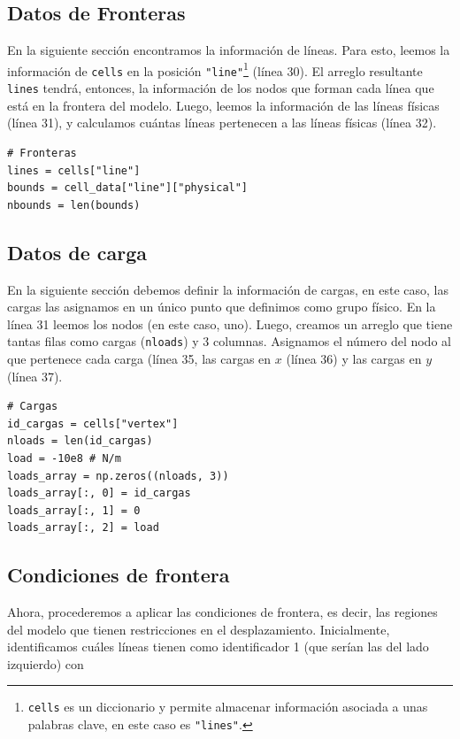 \documentclass[12pt,letterpaper]{article}
\newcommand{\mintpy}[1]{\texttt{#1}}
\begin{document}
\subsection{Datos de Fronteras}
En la siguiente sección encontramos la información de líneas. Para esto, leemos la información de \mintpy{cells} en la posición \mintpy{"line"}\footnote{\mintpy{cells} es un diccionario y permite almacenar información asociada a unas palabras clave, en este caso es \mintpy{"lines"}.} (línea 30). El arreglo resultante \mintpy{lines} tendrá, entonces, la información de los nodos que forman cada línea que está en la frontera del modelo. Luego, leemos la información de las líneas físicas (línea 31), y calculamos cuántas líneas pertenecen a las líneas físicas (línea 32).
\begin{verbatim}
# Fronteras
lines = cells["line"]
bounds = cell_data["line"]["physical"]
nbounds = len(bounds)
\end{verbatim}

\subsection{Datos de carga}
En la siguiente sección debemos definir la información de cargas, en este caso, las cargas las asignamos en un único punto que definimos como grupo físico. En la línea 31 leemos los nodos (en este caso, uno). Luego, creamos un arreglo que tiene tantas filas como cargas (\mintpy{nloads}) y 3 columnas. Asignamos el número del nodo al que pertenece cada carga (línea 35, las cargas en $x$ (línea 36) y las cargas en $y$ (línea 37).
\begin{verbatim}
# Cargas
id_cargas = cells["vertex"]
nloads = len(id_cargas)
load = -10e8 # N/m
loads_array = np.zeros((nloads, 3))
loads_array[:, 0] = id_cargas
loads_array[:, 1] = 0
loads_array[:, 2] = load
\end{verbatim}

\subsection{Condiciones de frontera}
Ahora, procederemos a aplicar las condiciones de frontera, es decir, las regiones del modelo que tienen restricciones en el desplazamiento. Inicialmente, identificamos cuáles líneas tienen como identificador 1 (que serían las del lado izquierdo) con
\end{document}
